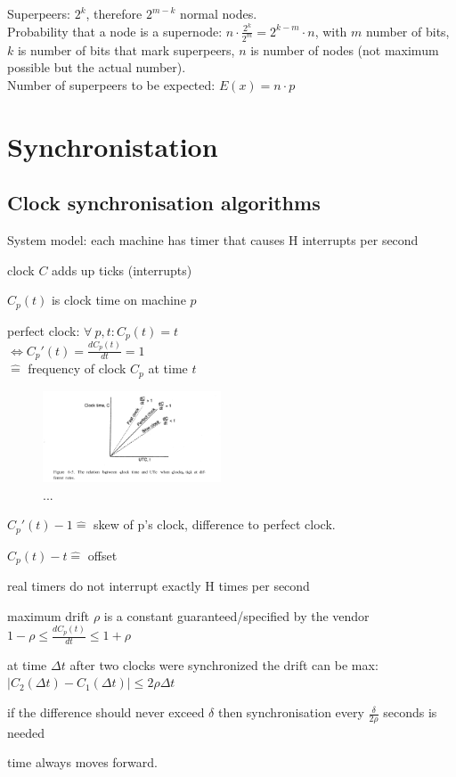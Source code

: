 \documentclass[ngerman,a4paper]{report}
\begin{document}
Superpeers: $2^k$, therefore $2^{m-k}$ normal nodes.\\
Probability that a node is a supernode: $n\cdot \frac{2^k}{2^m} = 2^{k-m} \cdot n$, with $m$ number of bits, $k$ is number of bits that mark superpeers, $n$ is number of nodes (not maximum possible but the actual number).\\
Number of superpeers to be expected: $E(x)= n\cdot p$\\

\chapter{Synchronistation}
\section{Clock synchronisation algorithms}
System model: each machine has timer that causes H interrupts per second
\begin{compactitem}
	\item clock $C$ adds up ticks (interrupts)
	\item $C_p(t)$ is clock time on machine $p$
	\item perfect clock: $\forall \  p, t : C_p(t) = t $ \\
	$\Longleftrightarrow C_p'(t) = \frac{d C_p(t)}{dt} = 1$\\
	$\mathrel{\widehat{=}}$ frequency of clock $C_p$ at time $t$
	
\begin{figure}[h]
	\centering
	\includegraphics[width=200px]{gfx/clock-drift.png}
	\caption{...}
	\label{img:clock-drift}
\end{figure}	
	
	\item $C_p'(t) - 1 \mathrel{\widehat{=}}$ skew of p's clock, difference to perfect clock.
	\item $C_p(t)-t \mathrel{\widehat{=}}$ offset
	\item real timers do not interrupt exactly H times per second 
	\item maximum drift $\rho$ is a constant guaranteed/specified by the vendor \\
	$1-\rho \leq \frac{d C_p(t)}{dt} \leq 1 + \rho$
	
	\item at time $\Delta t$ after two clocks were synchronized the drift can be max: \\
	$|C_2(\Delta t) - C_1(\Delta t) | \leq 2 \rho \Delta t$
	\item if the difference should never exceed $\delta$ then synchronisation every $\frac {\delta}{2 \rho}$ seconds is needed
	\item time always moves forward.
\end{compactitem}
\end{document}
